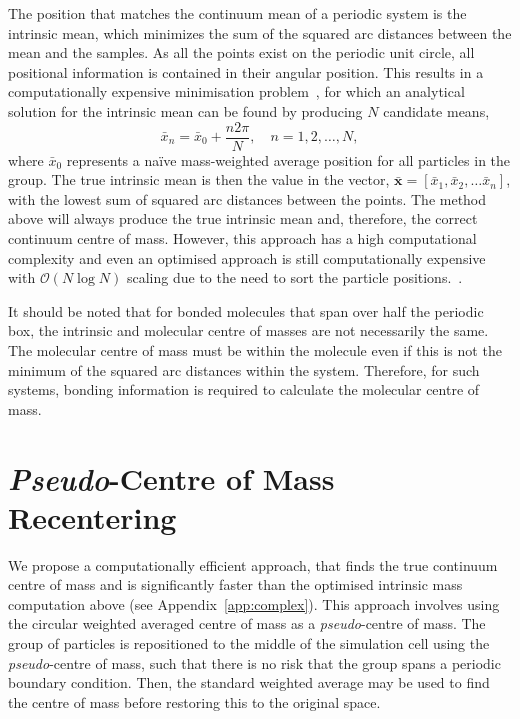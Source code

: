 \documentclass[reprint,superscriptaddress,nobibnotes,amsmath,amssymb,aip]{revtex4-2}
\begin{document}
The position that matches the continuum mean of a periodic system is the intrinsic mean, which minimizes the sum of the squared arc distances between the mean and the samples. 
As all the points exist on the periodic unit circle, all positional information is contained in their angular position. 
This results in a computationally expensive minimisation problem~\cite{hotz_extrinsic_2013}, for which an analytical solution for the intrinsic mean can be found by producing $N$ candidate means,
%
\begin{equation}
\bar{x}_{n} = \bar{x}_0 + \frac{n 2\pi}{N}, \quad n = 1, 2, \dots, N,
\end{equation}
%
where $\bar{x}_0$ represents a naïve mass-weighted average position for all particles in the group.
The true intrinsic mean is then the value in the vector, $\bar{\bm{x}} = [\bar{x}_{1}, \bar{x}_{2}, \ldots \bar{x}_{n}]$, with the lowest sum of squared arc distances between the points.
The method above will always produce the true intrinsic mean and, therefore, the correct continuum centre of mass. 
However, this approach has a high computational complexity and even an optimised approach is still computationally expensive with $\mathcal{O}(N\log N)$ scaling due to the need to sort the particle positions.~\cite{hotz_extrinsic_2013,miolane_geomstats_2020}.

It should be noted that for bonded molecules that span over half the periodic box, the intrinsic and molecular centre of masses are not necessarily the same.
The molecular centre of mass must be within the molecule even if this is not the minimum of the squared arc distances within the system.
Therefore, for such systems, bonding information is required to calculate the molecular centre of mass. 

\section{\emph{Pseudo}-Centre of Mass Recentering}

We propose a computationally efficient approach, that finds the true continuum centre of mass and is significantly faster than the optimised intrinsic mass computation above (see Appendix~\ref{app:complex}). 
This approach involves using the circular weighted averaged centre of mass as a \emph{pseudo}-centre of mass. 
The group of particles is repositioned to the middle of the simulation cell using the \emph{pseudo}-centre of mass, such that there is no risk that the group spans a periodic boundary condition. 
Then, the standard weighted average may be used to find the centre of mass before restoring this to the original space. 
\end{document}
